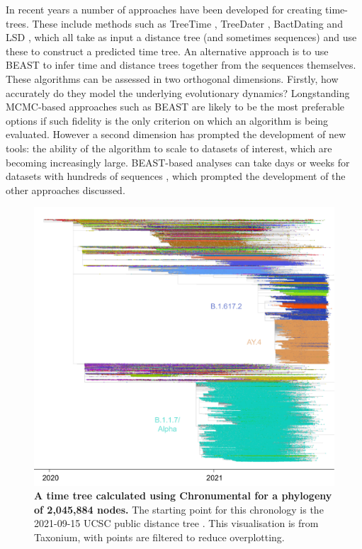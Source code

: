 In recent years a number of approaches have been developed for creating time-trees. These include methods such as TreeTime \citep{Sagulenko2018-kr}, TreeDater \citep{Volz2017-le},  BactDating \citep{Didelot2018-vf} and LSD \citep{To2016-cw} , which all take as input a distance tree (and sometimes sequences) and use these to construct a predicted time tree. An alternative approach is to use BEAST \citep{Suchard2018-ma} to infer time and distance trees together from the sequences themselves. These algorithms can be assessed in two orthogonal dimensions. Firstly, how accurately do they model the underlying evolutionary dynamics? Longstanding MCMC-based approaches such as BEAST are likely to be the most preferable options if such fidelity is the only criterion on which an algorithm is being evaluated. However a second dimension has prompted the development of new tools: the ability of the algorithm to scale to datasets of interest, which are becoming increasingly large. BEAST-based analyses can take days or weeks for datasets with hundreds of sequences \citep{Sagulenko2018-kr}, which prompted the development of the other approaches discussed.

\begin{figure}[t]
\centering
\includegraphics[width=1\linewidth]{Figures/timetree.pdf}
\caption{\textbf{A time tree calculated using Chronumental for a phylogeny of 2,045,884 nodes.} The starting point for this chronology is the 2021-09-15 UCSC public distance tree  \citep{McBroome2021-fn}. This visualisation is from Taxonium, with points are filtered to reduce overplotting.
}
\label{publictree}
\end{figure}

